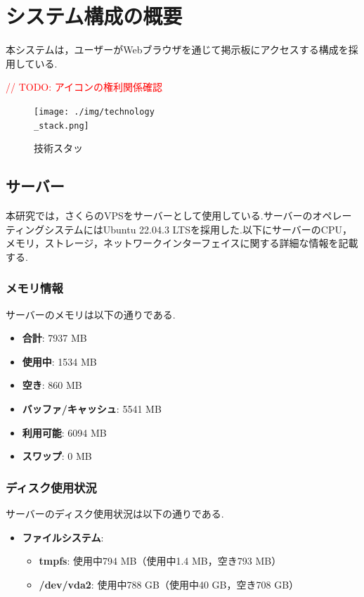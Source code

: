 \documentclass[b5paper,12pt,dvipdfmx]{jsreport}
\newcommand{\red}[1]{\textcolor{red}{#1}}
\begin{document}


\section{システム構成の概要}
本システムは，ユーザーがWebブラウザを通じて掲示板にアクセスする構成を採用している.

\red{// TODO: アイコンの権利関係確認}

\begin{figure}[htbp]
	\centering
	\texttt{[image: ./img/technology\\\_stack.png]}

	\caption*{技術スタッ}
\end{figure}


\subsection{サーバー}
本研究では，さくらのVPSをサーバーとして使用している.サーバーのオペレーティングシステムにはUbuntu 22.04.3 LTSを採用した.以下にサーバーのCPU，メモリ，ストレージ，ネットワークインターフェイスに関する詳細な情報を記載する.

\subsubsection{メモリ情報}
サーバーのメモリは以下の通りである.
\begin{itemize}
    \item \textbf{合計}: 7937 MB
    \item \textbf{使用中}: 1534 MB
    \item \textbf{空き}: 860 MB
    \item \textbf{バッファ/キャッシュ}: 5541 MB
    \item \textbf{利用可能}: 6094 MB
    \item \textbf{スワップ}: 0 MB
\end{itemize}

\subsubsection{ディスク使用状況}
サーバーのディスク使用状況は以下の通りである.
\begin{itemize}
    \item \textbf{ファイルシステム}:
    \begin{itemize}
        \item \textbf{tmpfs}: 使用中794 MB（使用中1.4 MB，空き793 MB）
        \item \textbf{/dev/vda2}: 使用中788 GB（使用中40 GB，空き708 GB）
    \end{itemize}
\end{itemize}
\end{document}
